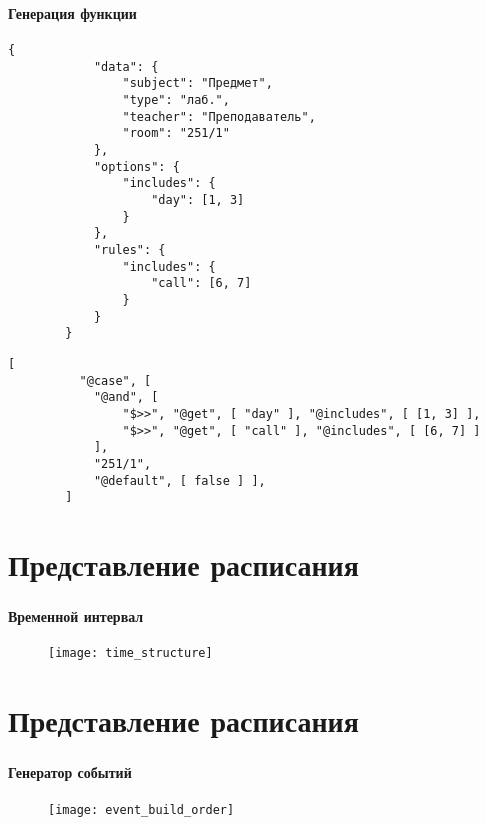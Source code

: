 \begin{frame}[fragile]
\frametitle{\insertsection}
\framesubtitle{Генерация функции}
    \begin{lstlisting}[basicstyle=\tiny]
        {
            "data": {
                "subject": "Предмет",
                "type": "лаб.",
                "teacher": "Преподаватель",
                "room": "251/1"
            },
            "options": {
                "includes": {
                    "day": [1, 3]
                }
            },
            "rules": {
                "includes": {
                    "call": [6, 7]
                }
            }
        }
    \end{lstlisting}
\endminipage\hfill
{}
    \begin{lstlisting}[basicstyle=\tiny]
        [
          "@case", [
            "@and", [
                "$>>", "@get", [ "day" ], "@includes", [ [1, 3] ],
                "$>>", "@get", [ "call" ], "@includes", [ [6, 7] ]
            ],
            "251/1",
            "@default", [ false ] ],
        ]
    \end{lstlisting}
\endminipage

\end{frame}


\section{Представление расписания}

\begin{frame}[fragile]
\frametitle{\insertsection}
\framesubtitle{Временной интервал}

\begin{figure}
    \center
    \texttt{[image: time\_structure]}
\end{figure}
\end{frame}


\section{Представление расписания}

\begin{frame}
\frametitle{\insertsection}
\framesubtitle{Генератор событий}

\vspace{2cm}

\begin{figure}
    \center
    \texttt{[image: event\_build\_order]}
\end{figure}
\end{frame}

